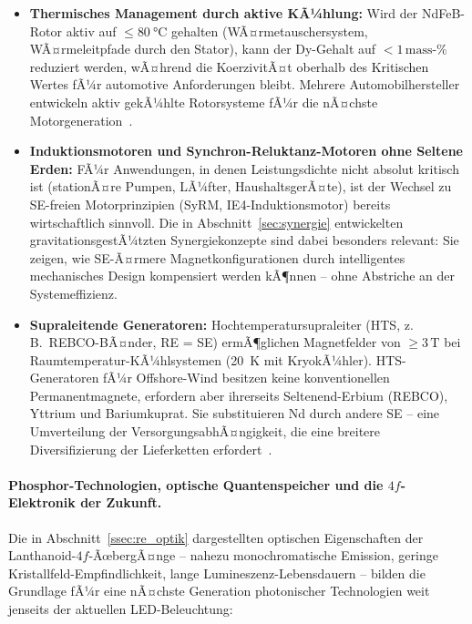 ﻿\documentclass[12pt, a4paper]{report}
\theoremstyle{definition}
\theoremstyle{remark}
\begin{document}
\begin{itemize}
  \item \textbf{Thermisches Management durch aktive KÃ¼hlung:}
    Wird der NdFeB-Rotor aktiv auf $\leq \SI{80}{\celsius}$ gehalten (WÃ¤rmetauschersystem,
    WÃ¤rmeleitpfade durch den Stator), kann der Dy-Gehalt auf $< 1\,\text{mass-\%}$
    reduziert werden, wÃ¤hrend die KoerzivitÃ¤t oberhalb des Kritischen Wertes
    fÃ¼r automotive Anforderungen bleibt. Mehrere Automobilhersteller
    entwickeln aktiv gekÃ¼hlte Rotorsysteme fÃ¼r die nÃ¤chste
    Motorgeneration~\cite{gutfleisch2011}.

  \item \textbf{Induktionsmotoren und Synchron-Reluktanz-Motoren ohne Seltene Erden:}
    FÃ¼r Anwendungen, in denen Leistungsdichte nicht absolut kritisch ist
    (stationÃ¤re Pumpen, LÃ¼fter, HaushaltsgerÃ¤te), ist der Wechsel zu
    SE-freien Motorprinzipien (SyRM, IE4-Induktionsmotor) bereits
    wirtschaftlich sinnvoll. Die in Abschnitt~\ref{sec:synergie}
    entwickelten gravitationsgestÃ¼tzten Synergiekonzepte sind dabei
    besonders relevant: Sie zeigen, wie SE-Ã¤rmere Magnetkonfigurationen
    durch intelligentes mechanisches Design kompensiert werden kÃ¶nnen --
    ohne Abstriche an der Systemeffizienz.

  \item \textbf{Supraleitende Generatoren:}
    Hochtemperatursupraleiter (HTS, z.\,B.\ REBCO-BÃ¤nder, RE = SE)
    ermÃ¶glichen Magnetfelder von $\geq 3\,\text{T}$ bei Raumtemperatur-KÃ¼hlsystemen
    (20~K mit KryokÃ¼hler). HTS-Generatoren fÃ¼r Offshore-Wind besitzen keine
    konventionellen Permanentmagnete, erfordern aber ihrerseits Seltenend-Erbium
    (REBCO), Yttrium und Bariumkuprat. Sie substituieren Nd durch andere SE
    -- eine Umverteilung der VersorgungsabhÃ¤ngigkeit, die eine breitere
    Diversifizierung der Lieferketten erfordert~\cite{iea2021}.
\end{itemize}

\paragraph{Phosphor-Technologien, optische Quantenspeicher und die
$4f$-Elektronik der Zukunft.}
Die in Abschnitt~\ref{ssec:re_optik} dargestellten optischen Eigenschaften
der Lanthanoid-$4f$-ÃœbergÃ¤nge -- nahezu monochromatische Emission, geringe
Kristallfeld-Empfindlichkeit, lange Lumineszenz-Lebensdauern -- bilden die
Grundlage fÃ¼r eine nÃ¤chste Generation photonischer Technologien weit
jenseits der aktuellen LED-Beleuchtung:
\end{document}
